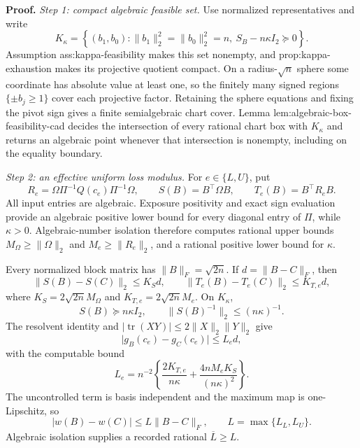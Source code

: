 \textbf{Proof.}
\emph{Step 1: compact algebraic feasible set.}
Use normalized representatives and write
\[
 K_\kappa=\left\{(b_1,b_0):
 \lVert b_1\rVert_2^2=\lVert b_0\rVert_2^2=n,
 \ S_B-n\kappa I_2\succeq0\right\}.
\]
Assumption ass:kappa-feasibility makes this set nonempty, and prop:kappa-exhaustion makes its projective quotient compact.  On a radius-\(\sqrt n\) sphere some coordinate has absolute value at least one, so the finitely many signed regions \(\{\pm b_j\ge1\}\) cover each projective factor.  Retaining the sphere equations and fixing the pivot sign gives a finite semialgebraic chart cover.  Lemma lem:algebraic-box-feasibility-cad decides the intersection of every rational chart box with \(K_\kappa\) and returns an algebraic point whenever that intersection is nonempty, including on the equality boundary.

\emph{Step 2: an effective uniform loss modulus.}
For \(e\in\{L,U\}\), put
\[
 R_e=\Omega\Pi^{-1}Q(c_e)\Pi^{-1}\Omega,
 \qquad S(B)=B^{\top}\Omega B,
 \qquad T_e(B)=B^{\top}R_eB.
\]
All input entries are algebraic.  Exposure positivity and exact sign evaluation provide an algebraic positive lower bound for every diagonal entry of \(\Pi\), while \(\kappa>0\).  Algebraic-number isolation therefore computes rational upper bounds \(M_\Omega\ge\lVert\Omega\rVert_2\) and \(M_e\ge\lVert R_e\rVert_2\), and a rational positive lower bound for \(\kappa\).

Every normalized block matrix has \(\lVert B\rVert_F=\sqrt{2n}\).  If \(d=\lVert B-C\rVert_F\), then
\[
 \lVert S(B)-S(C)\rVert_2\le K_Sd,
 \qquad
 \lVert T_e(B)-T_e(C)\rVert_2\le K_{T,e}d,
\]
where \(K_S=2\sqrt{2n}M_\Omega\) and \(K_{T,e}=2\sqrt{2n}M_e\).  On \(K_\kappa\),
\[
 S(B)\succeq n\kappa I_2,
 \qquad \lVert S(B)^{-1}\rVert_2\le(n\kappa)^{-1}.
\]
The resolvent identity and \(\lvert\operatorname{tr}(XY)\rvert\le2\lVert X\rVert_2\lVert Y\rVert_2\) give
\[
 \lvert g_B(c_e)-g_C(c_e)\rvert\le L_e d,
\]
with the computable bound
\[
 L_e=n^{-2}\left\{
 \frac{2K_{T,e}}{n\kappa}
 +\frac{4nM_eK_S}{(n\kappa)^2}\right\}.
\]
The uncontrolled term is basis independent and the maximum map is one-Lipschitz, so
\[
 \lvert w(B)-w(C)\rvert\le L\lVert B-C\rVert_F,
 \qquad L=\max\{L_L,L_U\}.
 \tag{1}
\]
Algebraic isolation supplies a recorded rational \(\overline L\ge L\).

